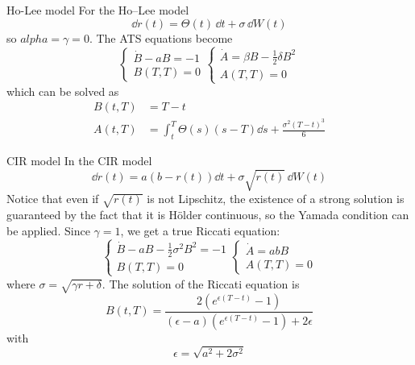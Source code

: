 \begin{example}{Ho-Lee model}{}{}
    For the Ho–Lee model
    \begin{equation*}
        \dd r(t) = \Theta(t)\,\dd t + \sigma\,\dd W(t)
    \end{equation*}
    so $alpha = \gamma = 0$. The ATS equations become
    \begin{equation*}
    \begin{cases}
        \dot{B} - aB = -1 \\
        B(T,T) = 0
    \end{cases}
    \begin{cases}
    \dot{A} = \beta B - \frac{1}{2}\delta B^2 \\
    A(T,T) = 0
    \end{cases}
    \end{equation*}
    which can be solved as
    \begin{align*}
        B(t,T) &= T-t \\
        A(t,T) &= \int_t^T \Theta(s)(s-T)\dd s + \frac{\sigma^2(T-t)^3}{6}
    \end{align*}
\end{example} %
\begin{example}{CIR model}{}{}
    In the CIR model
    \begin{equation*}
        \dd r(t) = a(b-r(t))\dd t + \sigma\sqrt{r(t)}\,\dd W(t)
    \end{equation*}
    Notice that even if $\sqrt{r(t)}$ is not Lipschitz, the existence of a strong solution is guaranteed by the fact that it is Hölder continuous, so the Yamada condition can be applied. Since $\gamma = 1$, we get a true Riccati equation:
    \begin{equation*}
    \begin{cases}
        \dot{B} - aB - \frac{1}{2}\sigma^2 B^2 = -1 \\
        B(T,T) = 0
    \end{cases}
    \begin{cases}
    \dot{A} = a b B\\
    A(T,T) = 0
    \end{cases}
    \end{equation*}
    where $\sigma = \sqrt{\gamma r + \delta}$. The solution of the Riccati equation is
    \begin{equation*}
        B(t,T) = \frac{2(e^{\epsilon(T-t)}-1)}{(\epsilon-a)(e^{\epsilon(T-t)}-1)+2\epsilon}
    \end{equation*}
    with
    \begin{equation*}
        \epsilon = \sqrt{a^2 + 2\sigma^2}
    \end{equation*}
\end{example}

